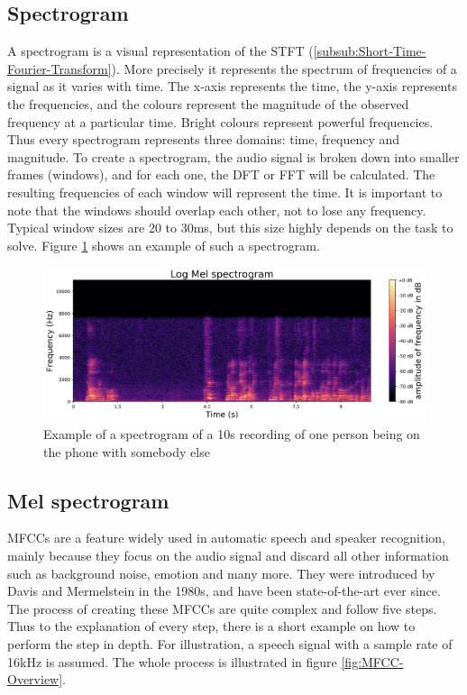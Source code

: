 \subsection{Spectrogram}
\label{sub:Spectrogram}
A spectrogram is a visual representation of the \gls{STFT} (\ref{subsub:Short-Time-Fourier-Transform}). More precisely it represents the spectrum of frequencies of a signal as it varies with time. The x-axis represents the time, the y-axis represents the frequencies, and the colours represent the magnitude of the observed frequency at a particular time. Bright colours represent powerful frequencies. Thus every spectrogram represents three domains: time, frequency and magnitude.
\newline
\newline
To create a spectrogram, the audio signal is broken down into smaller frames (windows), and for each one, the \gls{DFT} or \gls{FFT} will be calculated. The resulting frequencies of each window will represent the time. It is important to note that the windows should overlap each other, not to lose any frequency. Typical window sizes are 20 to 30ms, but this size highly depends on the task to solve. Figure \ref{fig:Spectrogram} shows an example of such a spectrogram.
\begin{figure}[htbp]
	\centering
	\includegraphics[scale=0.5]{img/log_mel_spectrogram.png}
	\caption{Example of a spectrogram of a 10s recording of one person being on the phone with somebody else}
	\label{fig:Spectrogram}
\end{figure}

\subsection{Mel spectrogram}
\label{sub:Mel-Spectrogram}
\Glspl{MFCC} are a feature widely used in automatic speech and speaker recognition, mainly because they focus on the audio signal and discard all other information such as background noise, emotion and many more. They were introduced by Davis and Mermelstein in the 1980s, and have been state-of-the-art ever since.
\newline
\newline
The process of creating these \glspl{MFCC} are quite complex and follow five steps. Thus to the explanation of every step, there is a short example on how to perform the step in depth. For illustration, a speech signal with a sample rate of 16kHz is assumed. The whole process is illustrated in figure \ref{fig:MFCC-Overview}.

